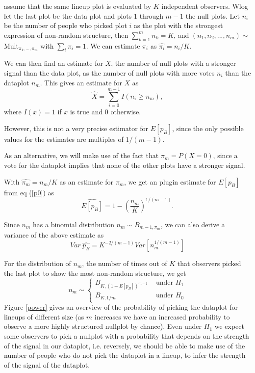\documentclass[11pt]{article}
\begin{document}
assume that the same lineup plot is evaluated by $K$ independent observers. Wlog let the last plot be the data plot and plots 1 through $m-1$ the null plots. Let $n_i$ be the number of people who picked plot $i$ as the plot with the strongest expression of non-random structure, then $\sum_{k=1}^{m} n_k = K$, and $(n_1, n_2, ..., n_m) \sim$ Mult$_{\pi_1, ..., \pi_m}$ with $\sum_i \pi_i = 1$. We can estimate $\pi_i$ as $\widehat{\pi_i} = n_i/K$. 

We can then find an estimate for $X$, the number of null plots with a stronger signal than the data plot, as the number of null plots with more votes $n_i$ than the dataplot $n_m$. This gives an estimate for $X$ as
\[
\hat{X} = \sum_{i=0}^{m-1} I(n_i \ge n_m),
\]
where $I(x) = 1$ if $x$ is true and 0 otherwise.

However, this is not a very precise estimator for $E[p_B]$, since the only possible values for the  estimates are multiples of $1/(m-1)$.

As an alternative, we will make use of the fact that $\pi_m = P(X=0)$, since a vote for the dataplot implies that none of the other plots have a stronger signal.

With $\widehat{\pi_m} = n_m/K$ as an estimate for $\pi_m$, we get an plugin estimate for $E[p_B]$ from eq (\ref{p0}) as
\[
\widehat{E[p_B]} = 1 - \left( \frac{n_m}{K} \right)^{1/(m-1)}.
\]

Since $n_m$ has a binomial distribution $n_m \sim B_{m-1, \pi_m}$, we can also derive a variance of the above estimate as
\[
Var \ \widehat{p_B} = K^{-2/(m-1)} Var \left[n_m^{1/(m-1)}\right]
\]


For the distribution of $n_m$, the number of times out of $K$ that observers picked the last plot to show the most non-random structure, we get
\[
n_m\sim \left \{ 
\begin{array}{cl}
B_{K, (1-E[p_B])^{m-1}} & \text { under } H_1\\
B_{K, 1/m} & \text { under } H_0
\end{array}
\right .
\]
Figure \ref{power} gives an overview of the probability of picking the dataplot for lineups of different size (as $m$ increases we have an increased probability to observe a more highly structured nullplot by chance).
Even under $H_1$ we expect some observers to pick a nullplot with a probability that depends on the strength of the signal in our dataplot, i.e. reversely, we should be able to make use of the number of people who do not pick the dataplot in a lineup, to infer the strength of the signal of the dataplot.
\end{document}
